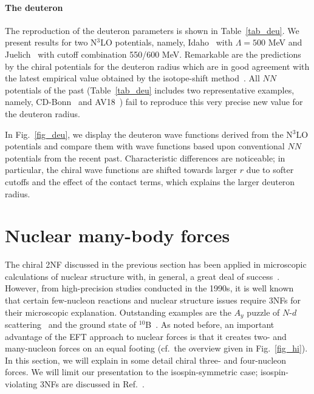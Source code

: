 \documentclass[sort&compress,preprint,3p]{elsarticle}
\begin{document}
\paragraph{The deuteron}

The reproduction of the deuteron parameters is shown 
in Table~\ref{tab_deu}.
We present results for two N$^3$LO potentials, namely, Idaho~\cite{EM03}
with $\Lambda=500$ MeV and Juelich~\cite{EGM05} with cutoff combination
550/600 MeV.
Remarkable are the predictions by the chiral potentials
for the deuteron radius which are in good agreement with the latest
empirical value obtained by the isotope-shift method~\cite{Hub98}. 
All $NN$ potentials of the past 
(Table~\ref{tab_deu} includes two representative examples,
namely, CD-Bonn~\cite{Mac01} and AV18~\cite{WSS95})
fail to reproduce this very precise new value for the deuteron radius.

In Fig.~\ref{fig_deu}, we display the deuteron wave functions derived from
the N$^3$LO potentials and compare them
with wave functions based upon conventional $NN$ potentials from the
recent past. Characteristic differences are noticeable; in particular,
the chiral wave functions are shifted towards larger $r$ 
due to softer cutoffs and the effect of the contact terms,
which explains the larger deuteron radius.

\section{Nuclear many-body forces \label{sec_manyNF}}

The chiral 2NF discussed in the previous section has been applied in microscopic
calculations of nuclear structure with, in general, a great deal of 
success~\cite{Cor02,Cor05,Cor10,NC04,FNO05,Kow04,DH04,Wlo05,Dea05,Gou06,Hag08,Hag10,FOS04,FOS09}.
However, from high-precision studies conducted in the 1990s, it is well known that certain few-nucleon
reactions and nuclear structure issues require 3NFs for their microscopic explanation.
Outstanding examples are the $A_y$ puzzle of $N$-$d$ scattering~\cite{Glo96,EMW02}
and the ground state of $^{10}$B~\cite{Cau02}.
As noted before, 
an important advantage of the EFT approach to nuclear forces
is that it creates two- and many-nucleon forces on an equal
footing (cf.\ the overview given in Fig.~\ref{fig_hi}).
In this section, we will explain in some detail chiral three- and four-nucleon forces.
We will limit our presentation to the isospin-symmetric case;
isospin-violating 3NFs are discussed in Ref.~\cite{EMP05}.
\end{document}
